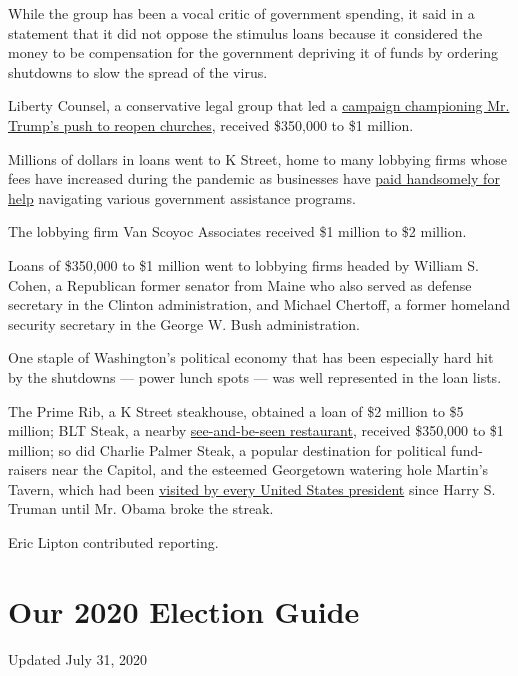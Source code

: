 While the group has been a vocal critic of government spending, it said
in a statement that it did not oppose the stimulus loans because it
considered the money to be compensation for the government depriving it
of funds by ordering shutdowns to slow the spread of the virus.

Liberty Counsel, a conservative legal group that led a
\href{https://lc.org/reopenchurch}{campaign championing Mr. Trump's push
to reopen churches}, received \$350,000 to \$1 million.

Millions of dollars in loans went to K Street, home to many lobbying
firms whose fees have increased during the pandemic as businesses have
\href{https://www.nytimes.com/2020/03/28/us/politics/coronavirus-money-lobbyists.html}{paid
handsomely for help} navigating various government assistance programs.

The lobbying firm Van Scoyoc Associates received \$1 million to \$2
million.

Loans of \$350,000 to \$1 million went to lobbying firms headed by
William S. Cohen, a Republican former senator from Maine who also served
as defense secretary in the Clinton administration, and Michael
Chertoff, a former homeland security secretary in the George W. Bush
administration.

One staple of Washington's political economy that has been especially
hard hit by the shutdowns --- power lunch spots --- was well represented
in the loan lists.

The Prime Rib, a K Street steakhouse, obtained a loan of \$2 million to
\$5 million; BLT Steak, a nearby
\href{https://www.nytimes.com/2017/09/19/us/politics/isnt-that-the-trump-lawyer-a-reporters-accidental-scoop.html}{see-and-be-seen
restaurant}, received \$350,000 to \$1 million; so did Charlie Palmer
Steak, a popular destination for political fund-raisers near the
Capitol, and the esteemed Georgetown watering hole Martin's Tavern,
which had been
\href{https://www.nytimes.com/2013/09/22/travel/a-presidential-pub-crawl.html}{visited
by every United States president} since Harry S. Truman until Mr. Obama
broke the streak.

Eric Lipton contributed reporting.

\hypertarget{our-2020-election-guide}{%
\section{Our 2020 Election Guide}\label{our-2020-election-guide}}

Updated July 31, 2020

